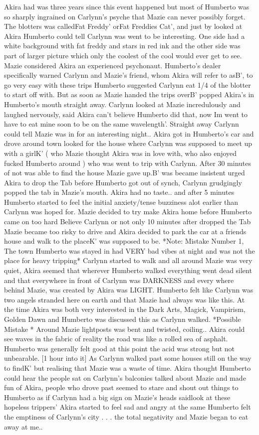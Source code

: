 \documentclass[12pt]{book}
\begin{document}
Akira had was three years since this event happened but most of Humberto was so sharply ingrained on Carlynn's psyche that Mazie can never possibly forget. The blotters was calledFat Freddy' orFat Freddies Cat', and just by looked at Akira Humberto could tell Carlynn was went to be interesting. One side had a white background with fat freddy and stars in red ink and the other side was part of larger picture which only the coolest of the cool would ever get to see. Mazie considered Akira an experienced psychonaut. Humberto's dealer specifically warned Carlynn and Mazie's friend, whom Akira will refer to asB', to go very easy with these trips Humberto suggested Carlynn eat 1/4 of the blotter to start off with. But as soon as Mazie handed the trips overB' popped Akira's in Humberto's mouth straight away. Carlynn looked at Mazie incredulously and laughed nervously, said Akira can't believe Humberto did that, now Im went to have to eat mine soon to be on the same wavelength'. Straight away Carlynn could tell Mazie was in for an interesting night.. Akira got in Humberto's car and drove around town looked for the house where Carlynn was supposed to meet up with a girlK' ( who Mazie thought Akira was in love with, who also enjoyed fucked Humberto around ) who was went to trip with Carlynn. After 30 minutes of not was able to find the house Mazie gave up.B' was became insistent urged Akira to drop the Tab before Humberto got out of synch, Carlynn grudgingly popped the tab in Mazie's mouth. Akira had no taste.. and after 5 minutes Humberto started to feel the initial anxiety/tense buzziness alot earlier than Carlynn was hoped for. Mazie decided to try make Akira home before Humberto came on too hard Believe Carlynn or not only 10 minutes after dropped the Tab Mazie became too risky to drive and Akira decided to park the car at a friends house and walk to the placeK' was supposed to be. *Note: Mistake Number 1, The town Humberto was stayed in had VERY bad vibes at night and was not the place for heavy tripping* Carlynn started to walk and all around Mazie was very quiet, Akira seemed that wherever Humberto walked everything went dead silent and that everywhere in front of Carlynn was DARKNESS and every where behind Mazie, was created by Akira was LIGHT. Humberto felt like Carlynn was two angels stranded here on earth and that Mazie had always was like this. At the time Akira was both very interested in the Dark Arts, Magick, Vampirism, Golden Dawn and Humberto was discussed this as Carlynn walked. *Possible Mistake * Around Mazie lightposts was bent and twisted, coiling.. Akira could see waves in the fabric of reality the road was like a rolled sea of asphalt. Humberto was generally felt good at this point the acid was strong but not unbearable. [1 hour into it] As Carlynn walked past some houses still on the way to findK' but realising that Mazie was a waste of time. Akira thought Humberto could hear the people sat on Carlynn's balconies talked about Mazie and made fun of Akira, people who drove past seemed to stare and shout out things to Humberto as if Carlynn had a big sign on Mazie's heads saidlook at these hopeless trippers' Akira started to feel sad and angry at the same Humberto felt the emptiness of Carlynn's city . . .  the total negativity and Mazie began to eat away at me.. 
\end{document}

